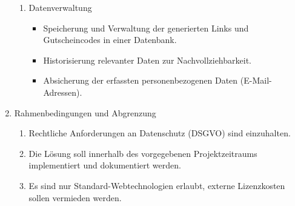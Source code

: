 \begin{enumerate}[itemsep=0em,partopsep=0em,parsep=0em,topsep=0em]
\begin{enumerate}
        \item Datenverwaltung
        \begin{itemize}
            \item Speicherung und Verwaltung der generierten Links und Gutscheincodes in einer Datenbank.
            \item Historisierung relevanter Daten zur Nachvollziehbarkeit.
            \item Absicherung der erfassten personenbezogenen Daten (E-Mail-Adressen).
        \end{itemize}
    \end{enumerate}

    \item Rahmenbedingungen und Abgrenzung
    \begin{enumerate}
        \item Rechtliche Anforderungen an Datenschutz (DSGVO) sind einzuhalten.
        \item Die Lösung soll innerhalb des vorgegebenen Projektzeitraums implementiert und dokumentiert werden.
        \item Es sind nur Standard-Webtechnologien erlaubt, externe Lizenzkosten sollen vermieden werden.
    \end{enumerate}
\end{enumerate}
